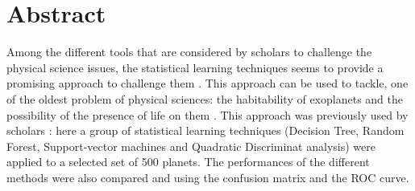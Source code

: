 \documentclass[
12pt, %
a4paper, %
oneside, %
headinclude,footinclude, %
BCOR5mm, %
]{scrartcl}
\begin{document}
\newpage



\section*{Abstract} %
Among the different tools that are considered by scholars to challenge the physical science issues, the statistical learning techniques seems to provide a promising approach to challenge them \cite{carleo2019machine}. This approach can be used to tackle, one of the oldest problem of physical sciences:  the habitability of exoplanets and the possibility of the presence of life on them \cite{seager2013exoplanet}. This approach was previously used by scholars \cite{armstrong2020exoplanet}: here a group of statistical learning techniques (Decision Tree, Random Forest, Support-vector machines and Quadratic Discriminat analysis) were applied to a selected set of 500 planets. The performances of the different methods were also compared and using the confusion matrix and the ROC curve.

\nocite{*}
\setcounter{tocdepth}{2} %

\tableofcontents %




\newpage %
\end{document}
